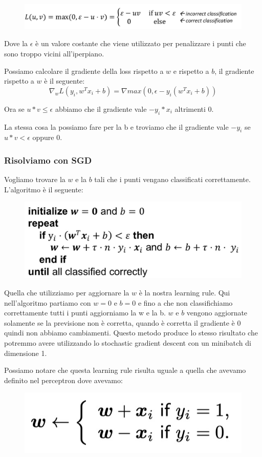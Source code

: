 \documentclass[14pt]{extreport}
\begin{document}
\begin{figure}[H]
	\centering
	\includegraphics[width=0.6\linewidth]{267.jpeg}
\end{figure}
Dove la $\epsilon$ è un valore costante che viene utilizzato per penalizzare i punti che sono troppo vicini all'iperpiano.

Possiamo calcolare il gradiente della loss rispetto a $w$ e rispetto a $b$, il gradiente rispetto a $w$ è il seguente: $$\nabla_w L(y_i, w^Tx_i+b) =
\nabla max(0, \epsilon - y_i(w^Tx_i+b))$$

Ora se $u*v \leq \epsilon$ abbiamo che il gradiente vale $-y_i*x_i$ altrimenti 0.

La stessa cosa la possiamo fare per la b e troviamo che il gradiente vale $-y_i$ se $u*v<\epsilon$ oppure 0.


\subsubsection{Risolviamo con SGD}

Vogliamo trovare la $w$ e la $b$ tali che i punti vengano classificati correttamente. L'algoritmo è il seguente:

\begin{figure}[H]
	\centering
	\includegraphics[width=0.6\linewidth]{268.jpeg}
\end{figure}

Quella che utilizziamo per aggiornare la $w$ è la nostra learning rule. Qui nell'algoritmo partiamo con $w=0$ e $b=0$ e fino a che non classifichiamo
correttamente tutti i punti aggiorniamo la w e la b. $w$ e $b$ vengono aggiornate solamente se la previsione non è corretta, quando è corretta il
gradiente è 0 quindi non abbiamo cambiamenti. Questo metodo produce lo stesso risultato che potremmo avere utilizzando lo stochastic gradient descent
con un minibatch di dimensione 1.

Possiamo notare che questa learning rule risulta uguale a quella che avevamo definito nel perceptron dove avevamo:
\begin{figure}[H]
	\centering
	\includegraphics[width=0.7\linewidth]{269.jpeg}
\end{figure}
\end{document}
